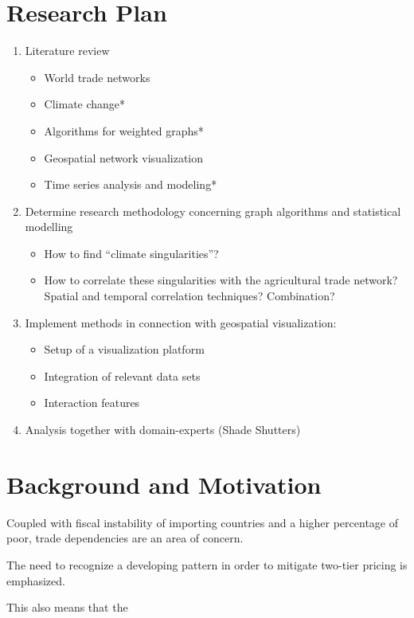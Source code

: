 \section{Research Plan}
\begin{enumerate}
	\item Literature review
	\begin{itemize}
		\item World trade networks
		\item Climate change*
		\item Algorithms for weighted graphs*
		\item Geospatial network visualization
		\item Time series analysis and modeling*
	\end{itemize}
	\item Determine research methodology concerning graph algorithms and statistical modelling
	\begin{itemize}
		\item How to find “climate singularities”?
		\item How to correlate these singularities with the agricultural trade network? Spatial and temporal correlation techniques? Combination?
	\end{itemize}
	\item Implement methods in connection with geospatial visualization:
	\begin{itemize}
		\item Setup of a visualization platform
		\item Integration of relevant data sets
		\item Interaction features
	\end{itemize}
	\item Analysis together with domain-experts (Shade Shutters)
\end{enumerate}
\section{Background and Motivation}




Coupled with fiscal instability of importing countries and a higher percentage of poor, trade dependencies are an area of concern. 



The need to recognize a developing pattern in order to mitigate two-tier pricing is emphasized.

This also means that the 

